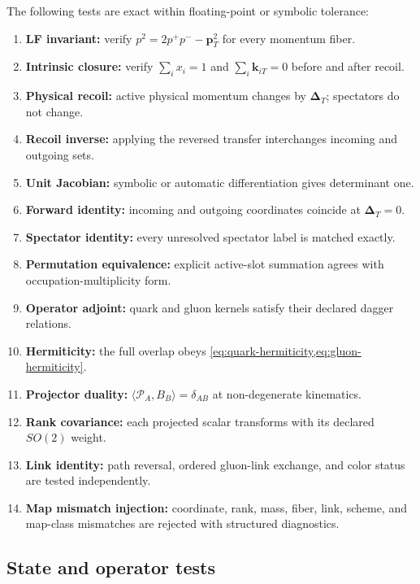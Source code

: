 \documentclass[11pt]{article}
\newcommand{\kiT}{\bm{k}_{iT}}
\newcommand{\DT}{\bm{\Delta}_{T}}
\newcommand{\cP}{\mathcal P}
\begin{document}
The following tests are exact within floating-point or symbolic tolerance:
\begin{enumerate}
\item \textbf{LF invariant:}
      verify \(p^2=2p^+p^- -\bm p_T^2\) for every momentum fiber.
\item \textbf{Intrinsic closure:}
      verify \(\sum_i x_i=1\) and \(\sum_i\kiT=0\) before and after recoil.
\item \textbf{Physical recoil:}
      active physical momentum changes by \(\DT\); spectators do not change.
\item \textbf{Recoil inverse:}
      applying the reversed transfer interchanges incoming and outgoing sets.
\item \textbf{Unit Jacobian:}
      symbolic or automatic differentiation gives determinant one.
\item \textbf{Forward identity:}
      incoming and outgoing coordinates coincide at \(\DT=0\).
\item \textbf{Spectator identity:}
      every unresolved spectator label is matched exactly.
\item \textbf{Permutation equivalence:}
      explicit active-slot summation agrees with occupation-multiplicity form.
\item \textbf{Operator adjoint:}
      quark and gluon kernels satisfy their declared dagger relations.
\item \textbf{Hermiticity:}
      the full overlap obeys
      \cref{eq:quark-hermiticity,eq:gluon-hermiticity}.
\item \textbf{Projector duality:}
      \(\langle\cP_A,B_B\rangle=\delta_{AB}\) at non-degenerate kinematics.
\item \textbf{Rank covariance:}
      each projected scalar transforms with its declared \(SO(2)\) weight.
\item \textbf{Link identity:}
      path reversal, ordered gluon-link exchange, and color status are tested
      independently.
\item \textbf{Map mismatch injection:}
      coordinate, rank, mass, fiber, link, scheme, and map-class mismatches are
      rejected with structured diagnostics.
\end{enumerate}

\subsection{State and operator tests}
\end{document}
